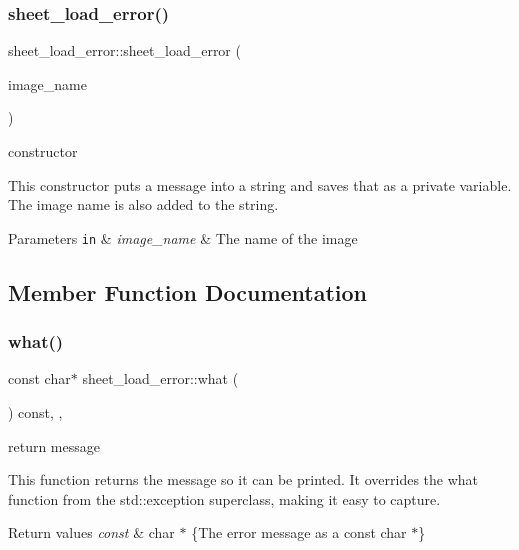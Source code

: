 \subsubsection{\texorpdfstring{sheet\+\_\+load\+\_\+error()}{sheet\_load\_error()}}
{\footnotesize\ttfamily sheet\+\_\+load\+\_\+error\+::sheet\+\_\+load\+\_\+error (\begin{DoxyParamCaption}\item[{const std\+::string \&}]{image\+\_\+name }\end{DoxyParamCaption})\hspace{0.3cm}{\ttfamily [inline]}}



constructor 

This constructor puts a message into a string and saves that as a private variable. The image name is also added to the string.


\begin{DoxyParams}[1]{Parameters}
\mbox{\tt in}  & {\em image\+\_\+name} & The name of the image \\
\hline
\end{DoxyParams}


\subsection{Member Function Documentation}
\mbox{\label{classsheet__load__error_a57dd1a273a0720e58ec0eb667d0c85aa}} 
\subsubsection{\texorpdfstring{what()}{what()}}
{\footnotesize\ttfamily const char$\ast$ sheet\+\_\+load\+\_\+error\+::what (\begin{DoxyParamCaption}{ }\end{DoxyParamCaption}) const\hspace{0.3cm}{\ttfamily [inline]}, {\ttfamily [override]}, {\ttfamily [noexcept]}}



return message 

This function returns the message so it can be printed. It overrides the what function from the std\+::exception superclass, making it easy to capture.


\begin{DoxyRetVals}{Return values}
{\em const} & char $\ast$ \{The error message as a const char $\ast$\} \\
\hline
\end{DoxyRetVals}


